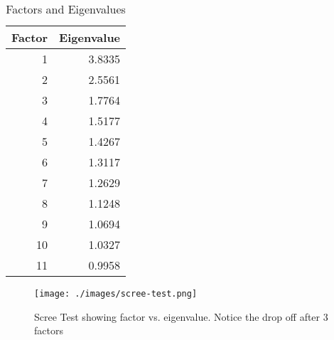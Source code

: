 \documentclass[12pt,a4paper,titlepage,twoside]{report}
\begin{document}
	\begin{minipage}[t]{\textwidth}	
		\begin{minipage}{0.3\textwidth}
		\begin{table}[H]
			\centering
			\begin{tabular}{|r|r|}
				\hline
				\textbf{Factor} & \textbf{Eigenvalue} \\ \hline
				1	&	3.8335 \\
				2	&	2.5561 \\
				3	&	1.7764 \\
				4	&	1.5177 \\
				5	&	1.4267 \\
				6	&	1.3117 \\
				7	&	1.2629 \\
				8	&	1.1248 \\
				9	&	1.0694 \\
				10 	&	1.0327 \\
				11	&   0.9958 \\
				\hline
			\end{tabular}
			\caption {Factors and Eigenvalues} 
			\label{tab:kaiser-tab} 
		\end{table}
		\end{minipage}%
		\hspace{0.6cm}%
		\begin{minipage}{0.7\textwidth}
		\begin{figure}[H]
			\centering
			\vspace{0.9cm}
			\texttt{[image: ./images/scree-test.png]}
			\caption{Scree Test showing factor vs. eigenvalue. Notice the drop off after 3 factors}
			\label{fig:scree-test}
		\end{figure}
		\end{minipage}
	\end{minipage} \\
	
\end{document}
